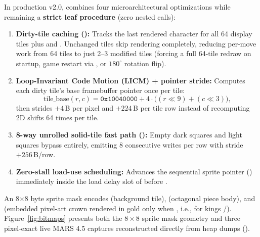 In production v2.0,  combines four microarchitectural optimizations while remaining a \textbf{strict leaf procedure} (zero nested  calls):
\begin{enumerate}
    \item \textbf{Dirty-tile caching ():} Tracks the last rendered character for all 64 display tiles plus  and . Unchanged tiles skip rendering completely, reducing per-move work from 64 tiles to just 2--3 modified tiles (forcing a full 64-tile redraw on startup, game restart via , or $180^\circ$ rotation flip).
    \item \textbf{Loop-Invariant Code Motion (LICM) + pointer stride:} Computes each dirty tile's base framebuffer pointer  once per tile:
    \begin{equation}
        \text{tile\_base}(r, c) = \texttt{0x10040000} + 4 \cdot \big((r \ll 9) + (c \ll 3)\big),
    \end{equation}
    then strides $+4$\,B per pixel and $+224$\,B per tile row instead of recomputing 2D shifts 64 times per tile.
    \item \textbf{8-way unrolled solid-tile fast path ():} Empty dark squares and light squares bypass  entirely, emitting 8 consecutive  writes per row with stride $+256$\,B/row.
    \item \textbf{Zero-stall load-use scheduling:} Advances the sequential sprite pointer () immediately inside the load delay slot of  before .
\end{enumerate}
An 8$\times$8 byte sprite mask  encodes  (background tile),  (octagonal piece body), and  (embedded pixel-art crown rendered in gold  only when , i.e., for kings /). Figure~\ref{fig:bitmaps} presents both the $8\times 8$ sprite mask geometry and three pixel-exact live MARS 4.5 captures reconstructed directly from heap dumps ().

